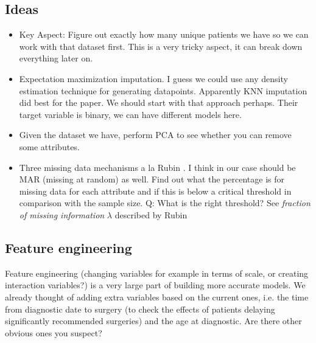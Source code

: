 \documentclass[a4paper]{article}
\begin{document}
\subsection{Ideas}
\begin{itemize}
\item Key Aspect: Figure out exactly how many unique patients we have so we can work with that dataset first. This is a very tricky aspect, it can break down everything later on. 
\item Expectation maximization imputation. I guess we could use any density estimation technique for generating datapoints. Apparently KNN imputation did best for the \cite{Garcia-Laencina2015} paper. We should start with that approach perhaps. Their target variable is binary, we can have different models here. 
\item Given the dataset we have, perform PCA to see whether you can remove some attributes.  
\item Three missing data mechanisms a la Rubin \cite{Little2012}. I think in our case should be MAR (missing at random) as well. Find out what the percentage is for missing data for each attribute and if this is below a critical threshold in comparison with the sample size. Q: What is the right threshold? See \textit{fraction of missing information} $\lambda$ described by Rubin
\end{itemize}
\subsection{Feature engineering}
Feature engineering (changing variables for example in terms of scale, or creating interaction variables?) is a very large part of building more accurate models. We already thought of adding extra variables based on the current ones, i.e. the time from diagnostic date to surgery (to check the effects of patients delaying significantly recommended surgeries) and the age at diagnostic. Are there other obvious ones you suspect? 



\end{document}
